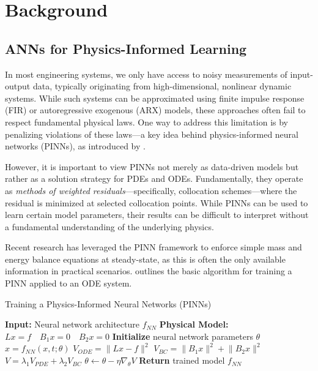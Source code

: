 \documentclass[fontsize=11pt]{article}
\newcommand{\norm}[1]{\lVert #1 \rVert}
\theoremstyle{definition}
\begin{document}
\section{Background}

\subsection{ANNs for Physics-Informed Learning}

In most engineering systems, we only have access to noisy measurements of 
input-output data, typically originating from high-dimensional, nonlinear dynamic 
systems. While such systems can be approximated using finite impulse response (FIR) 
or autoregressive exogenous (ARX) models, these approaches often fail to respect 
fundamental physical laws. One way to address this limitation is by penalizing 
violations of these laws—a key idea behind physics-informed neural networks (PINNs), 
as introduced by \cite{raissi:perdikaris:karniadakis:2019}.

However, it is important to view PINNs not merely as data-driven models but 
rather as a solution strategy for PDEs and ODEs. Fundamentally, they operate 
as \textit{methods of weighted residuals}—specifically, collocation schemes—where 
the residual is minimized at selected collocation points. While PINNs can be 
used to learn certain model parameters, their results can be difficult to interpret 
without a fundamental understanding of the underlying physics.

Recent research has leveraged the PINN framework to enforce simple mass and energy 
balance equations at steady-state, as this is often the only available information 
in practical scenarios.  outlines the basic algorithm for training 
a PINN applied to an ODE system.

\begin{algorithm}[h]
\caption{Training a Physics-Informed Neural Networks (PINNs)}
\label{alg:PINNs}
\begin{algorithmic}[1]
\State \textbf{Input:} Neural network architecture $f_{NN}$
\State \textbf{Physical Model:} $Lx=f \quad B_1 x = 0 \quad B_2 x = 0$
\State \textbf{Initialize} neural network parameters $\theta$
\Repeat
    \State $x = f_{NN}(x,t; \theta)$
    \State $V_{ODE} = \norm{Lx - f}^{2}$ 
    \State $V_{BC} = \norm{B_1 x}^{2} + \norm{B_2 x}^{2}$
    \State $V = \lambda_1 V_{PDE}  + \lambda_2 V_{BC}$
    \State $\theta \leftarrow \theta - \eta \nabla_{\theta} V$
\State \textbf{Return} trained model $f_{NN}$
\end{algorithmic}
\end{algorithm}
    
\end{document}
